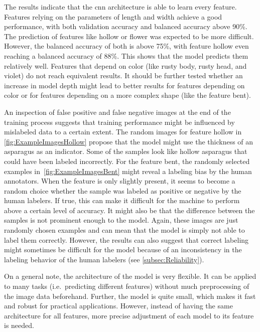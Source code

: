 \bigskip
The results indicate that the \acrshort{cnn} architecture is able to learn every feature. Features relying on the parameters of length and width achieve a good performance, with both validation accuracy and balanced accuracy above 90\%. The prediction of features like hollow or flower was expected to be more difficult. However, the balanced accuracy of both is above 75\%, with feature hollow even reaching a balanced accuracy of 88\%. This shows that the model predicts them relatively well. Features that depend on color (like rusty body, rusty head, and violet) do not reach equivalent results. It should be further tested whether an increase in model depth might lead to better results for features depending on color or for features depending on a more complex shape (like the feature bent).
 
An inspection of false positive and false negative images at the end of the training process suggests that training performance might be influenced by mislabeled data to a certain extent.
The random images for feature hollow in \autoref{fig:ExampleImagesHollow} propose that the model might use the thickness of an asparagus as an indicator. Some of the samples look like hollow asparagus that could have been labeled incorrectly.
For the feature bent, the randomly selected examples in~\autoref{fig:ExampleImagesBent} might reveal a labeling bias by the human annotators. When the feature is only slightly present, it seems to become a random choice whether the sample was labeled as positive or negative by the human labelers. If true, this can make it difficult for the machine to perform above a certain level of accuracy. It might also be that the difference between the samples is not prominent enough to the model.
Again, these images are just randomly chosen examples and can mean that the model is simply not able to label them correctly. However, the results can also suggest that correct labeling might sometimes be difficult for the model because of an inconsistency in the labeling behavior of the human labelers (see \autoref{subsec:Reliability}).
 
On a general note, the architecture of the model is very flexible. It can be applied to many tasks (i.e.\ predicting different features) without much preprocessing of the image data beforehand. Further, the model is quite small, which makes it fast and robust for practical applications. However, instead of having the same architecture for all features, more precise adjustment of each model to its feature is needed.
 
